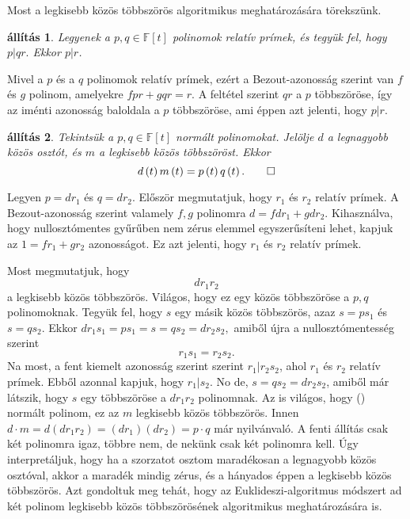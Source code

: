 \documentclass[9pt, a4paper, showtrims]{memoir}
\makeatletter
\renewenvironment{proof}[1][\proofname]
    {\par\pushQED{\qed}%
    \normalfont \topsep6\p@\@plus6\p@\relax
    \trivlist
    \item[\hskip\labelsep
        \itshape
    #1\@addpunct{:}]\ignorespaces}
    {\popQED\endtrivlist\@endpefalse}
\theoremstyle{plain}
\newtheorem{proposition}{állítás}[chapter]
\theoremstyle{remark}
\theoremstyle{definition}
\makeatother
\begin{document}
Most a legkisebb közös többszörös algoritmikus meghatározására törekszünk.
\begin{proposition}\label{pr:rprim}
	Legyenek a $p,q\in\mathbb{F}\left[ t \right]$ polinomok relatív prímek,
	és tegyük fel, hogy
	\begin{math}
		p|qr.
	\end{math}
	Ekkor $p|r$.
\end{proposition}
\begin{proof}
	Mivel a $p$ és a $q$ polinomok relatív prímek,
	ezért a Bezout-azonosság szerint van $f$ és $g$ polinom, amelyekre
	\(
	fpr+gqr=r.
	\)
	A feltétel szerint $qr$ a $p$ többszöröse,
	így az iménti azonosság baloldala a $p$ többszöröse,
	ami éppen azt jelenti, hogy $p|r$.
\end{proof}
\begin{proposition}
	Tekintsük a $p,q\in\mathbb{F}\left[ t \right]$ normált polinomokat.
	Jelölje $d$ a legnagyobb közös osztót,
	és
	$m$ a legkisebb közös többszöröst.
	Ekkor
	\begin{displaymath}
		d\left( t \right)m\left( t \right)=p\left( t \right)q\left( t \right).\qedhere
	\end{displaymath}
\end{proposition}
\begin{proof}
	Legyen $p=dr_1$ és $q=dr_2$.
	Először megmutatjuk, hogy $r_1$ és $r_2$ relatív prímek.
	A Bezout-azonosság szerint valamely $f,g$ polinomra
	\(
	d=fdr_1+gdr_2.
	\)
	Kihasználva, hogy nullosztómentes gyűrűben nem zérus elemmel egyszerűsíteni lehet,
	kapjuk az
	\(
	1=fr_1+gr_2
	\)
	azonosságot.
	Ez azt jelenti, hogy $r_1$ és $r_2$ relatív prímek.

	Most megmutatjuk, hogy
	\[
		dr_1r_2\tag{\dag}
	\]
	a legkisebb közös többszörös.
	Világos, hogy ez egy közös többszöröse a $p,q$ polinomoknak.
	Tegyük fel, hogy $s$ egy másik közös többszörös, azaz
	$s=ps_1$ és $s=qs_2$.
	Ekkor
	\begin{math}
		dr_1s_1=ps_1=s=qs_2=dr_2s_2,
	\end{math}
	amiből újra a nullosztómentesség szerint
	\[
		r_1s_1=r_2s_2.
	\]
	Na most,
	a fent kiemelt azonosság szerint szerint $r_1|r_2s_2$, ahol $r_1$ és $r_2$ relatív prímek.
	Ebből azonnal kapjuk, hogy $r_1|s_2$.
	No de, $s=qs_2=dr_2s_2$, amiből már látszik,
	hogy $s$ egy többszöröse a $dr_1r_2$ polinomnak.
	Az is világos, hogy (\dag) normált polinom, ez az $m$ legkisebb közös többszörös.
	Innen
	$d\cdot m=d(dr_1r_2)=(dr_1)(dr_2)=p\cdot q$ már nyilvánvaló.
\end{proof}
A fenti állítás csak két polinomra igaz, többre nem,
de nekünk csak két polinomra kell.
Úgy interpretáljuk,
hogy ha a szorzatot osztom maradékosan a legnagyobb közös osztóval, akkor a maradék mindig
zérus,
és a hányados éppen a legkisebb közös többszörös.
Azt gondoltuk meg tehát,
hogy az Euklideszi-algoritmus módszert ad két polinom legkisebb közös többszörösének algoritmikus meghatározására is.
\end{document}
